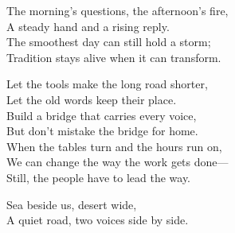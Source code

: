 \begin{lyrics}
The morning’s questions, the afternoon’s fire,\\
A steady hand and a rising reply.\\
The smoothest day can still hold a storm;\\
Tradition stays alive when it can transform.

Let the tools make the long road shorter,\\
Let the old words keep their place.\\
Build a bridge that carries every voice,\\
But don’t mistake the bridge for home.\\
When the tables turn and the hours run on,\\
We can change the way the work gets done—\\
Still, the people have to lead the way.

Sea beside us, desert wide,\\
A quiet road, two voices side by side.
\end{lyrics}


